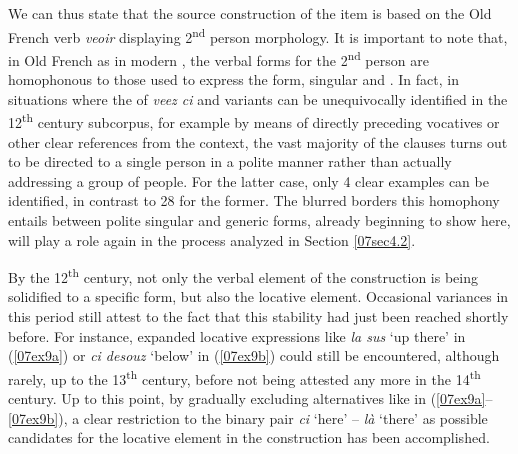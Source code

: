 \documentclass[output=paper,colorlinks,citecolor=brown]{langscibook}
\begin{document}
We can thus state that the source construction of the   item is based on the Old French verb \emph{veoir} displaying 2\textsuperscript{nd} person  morphology. It is important to note that, in Old French as in modern , the verbal forms for the 2\textsuperscript{nd} person  are homophonous to those used to express the  form, singular and . In fact, in situations where the  of \emph{veez ci} and variants can be unequivocally identified in the 12\textsuperscript{th} century subcorpus, for example by means of directly preceding vocatives or other clear references from the context, the vast majority of the clauses turns out to be directed to a single person in a polite manner rather than actually addressing a group of people. For the latter case, only 4 clear examples can be identified, in contrast to 28 for the former. The blurred borders this homophony entails between polite singular and generic  forms, already beginning to show here, will play a role again in the process analyzed in Section \ref{07sec4.2}.

By the 12\textsuperscript{th} century, not only the verbal element of the  construction is being solidified to a specific form, but also the locative element. Occasional variances in this period still attest to the fact that this stability had just been reached shortly before. For instance, expanded locative expressions like \emph{la sus} `up there' in (\ref{07ex9a}) or \emph{ci desouz} `below' in (\ref{07ex9b}) could still be encountered, although rarely, up to the 13\textsuperscript{th} century, before not being attested any more in the 14\textsuperscript{th} century. Up to this point, by gradually excluding alternatives like in (\ref{07ex9a}--\ref{07ex9b}), a clear restriction to the binary pair \emph{ci} `here' -- \emph{là} `there' as possible candidates for the locative element in the  construction has been accomplished.
\end{document}
